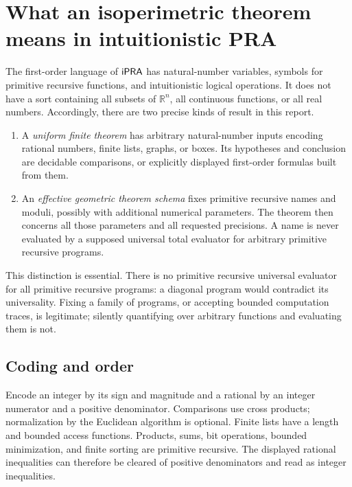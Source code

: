 \section{What an isoperimetric theorem means in intuitionistic PRA}
\label{sec:foundations}

The first-order language of \(\mathsf{iPRA}\) has natural-number variables, symbols
for primitive recursive functions, and intuitionistic logical operations.
It does not have a sort containing all subsets of \(\mathbb R^n\), all
continuous functions, or all real numbers. Accordingly, there are two
precise kinds of result in this report.

\begin{enumerate}
\item A \emph{uniform finite theorem} has arbitrary natural-number inputs
encoding rational numbers, finite lists, graphs, or boxes. Its hypotheses
and conclusion are decidable comparisons, or explicitly displayed
first-order formulas built from them.
\item An \emph{effective geometric theorem schema} fixes primitive
recursive names and moduli, possibly with additional numerical parameters.
The theorem then concerns all those parameters and all requested
precisions. A name is never evaluated by a supposed universal total
evaluator for arbitrary primitive recursive programs.
\end{enumerate}

This distinction is essential. There is no primitive recursive universal
evaluator for all primitive recursive programs: a diagonal program would
contradict its universality. Fixing a family of programs, or accepting
bounded computation traces, is legitimate; silently quantifying over
arbitrary functions and evaluating them is not.

\subsection{Coding and order}

Encode an integer by its sign and magnitude and a rational by an integer
numerator and a positive denominator. Comparisons use cross products;
normalization by the Euclidean algorithm is optional. Finite lists have
a length and bounded access functions. Products, sums, bit operations,
bounded minimization, and finite sorting are primitive recursive.
The displayed rational inequalities can therefore be cleared of positive
denominators and read as integer inequalities.

